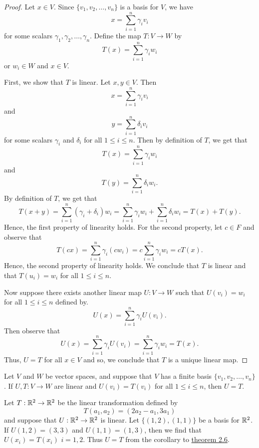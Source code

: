 \begin{proof}
Let \( x \in V  \). Since \( \{ v_{1}, v_{2}, \dots, v_{n} \}  \) is a basis for \( V  \), we have
\[  x = \sum_{ i=1 }^{ n } \gamma_{i} v_{i}  \] for some scalars \( \gamma_{1}, \gamma_{2}, \dots, \gamma_{n}  \). Define the map \( T: V \to W  \) by
\[  T(x) = \sum_{ i=1 }^{ n } \gamma_{i} w_{i}  \]
or \( w_{i} \in W  \) and \( x \in V  \). 

First, we show that \( T  \) is linear. Let \( x,y \in V  \). Then 
\[ x =  \sum_{ i=1 }^{ n } \gamma_{i} v_{i}  \] and 
\[ y =  \sum_{ i=1 }^{ n } \delta_{i} v_{i}  \] for some scalars \( \gamma_{i}  \) and \( \delta_{i}  \) for all \( 1 \leq i \leq n \). Then by definition of \( T  \), we get that 
\[  T(x) = \sum_{ i=1 }^{ n } \gamma_{i} w_{i}  \] and 
\[ T(y) = \sum_{ i=1 }^{ n } \delta_{i} w_{i}. \]
By definition of \( T  \), we get that  
\[  T(x+y) = \sum_{ i=1 }^{ n } (\gamma_{i} + \delta_{i}) w_{i} = \sum_{ i=1 }^{ n } \gamma_{i} w_{i} + \sum_{ i=1 }^{ n } \delta_{i} w_{i} = T(x) + T(y).  \]
Hence, the first property of linearity holds. For the second property, let \( c \in F  \) and observe that
\[  T(cx) = \sum_{ i=1 }^{ n } \gamma_{i} (cw_{i}) = c \sum_{ i=1 }^{ n } \gamma_{i} w_{i} = c T(x). \]
Hence, the second property of linearity holds. We conclude that \( T  \) is linear and that \( T(u_{i}) = w_{i}  \) for all \( 1 \leq i \leq n \).

Now suppose there exists another linear map \( U: V \to W  \) such that \( U(v_{i}) = w_{i}  \) for all \( 1 \leq i \leq n \) defined by.
\[ U(x) = \sum_{i =1  }^{ n } \gamma_{i} U(v_{i}).  \]
Then observe that
\[ U(x) = \sum_{ i=1 }^{ n } \gamma_{i} U(v_{i}) = \sum_{ i=1 }^{ n } \gamma_{i} w_{i} = T(x). \]
Thus, \( U = T  \) for all \( x \in V  \) and so, we conclude that \( T  \) is a unique linear map.
\end{proof}

\begin{corollary}\label{Corollary to Theorem 2.6}
  Let \( V  \) and \( W  \) be vector spaces, and suppose that \( V  \) has a finite basis \( \{ v_{1}, v_{2}, \dots, v_{n} \}  \). If \( U,T : V \to W  \) are linear and \( U(v_{i}) = T(v_{i}) \) for all \( 1 \leq i \leq n \), then \( U = T  \).  
\end{corollary}

\begin{eg}
    Let \( T : \mathbb{R}^{2} \to \mathbb{R}^{2}  \) be the linear transformation defined by 
    \[  T(a_{1}, a_{2}) = (2a_{2} - a_{1}, 3a_{1}) \]
    and suppose that \( U: \mathbb{R}^{2} \to \mathbb{R}^{2}  \) is linear. Let \( \{ (1,2), (1,1) \}  \) be a basis for \( \mathbb{R}^{2} \). If \( U(1,2) = (3,3)  \) and \( U(1,1) = (1,3)  \), then we find that \( U(x_{i}) = T(x_{i}) \) \( i = 1,2 \). Thus \( U = T  \) from the corollary to {\hyperref[Theorem 2.6]{theorem 2.6}}. 
\end{eg}


